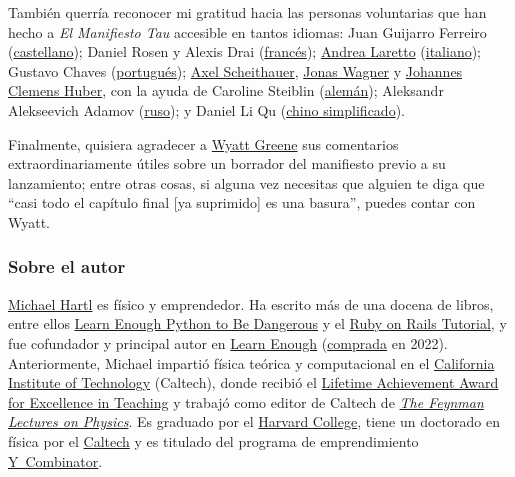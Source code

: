 También querría reconocer mi gratitud hacia las personas voluntarias que han hecho a \emph{El Manifiesto Tau} accesible en tantos idiomas: Juan Guijarro Ferreiro (\href{https://tauday.com/el-manifiesto-tau}{castellano}); Daniel Rosen y Alexis Drai (\href{https://tauday.com/le-manifeste-de-tau}{francés}); \href{https://iwilare.com/}{Andrea Laretto} (\href{https://tauday.com/il-tau-manifesto}{italiano}); Gustavo Chaves (\href{https://tauday.com/o-manifesto-tau}{portugués}); \href{https://www.linkedin.com/in/axelscheithauer/}{Axel Scheithauer}, \href{https://blog.purpureus.net/about}{Jonas Wagner} y \href{https://www.blogger.com/profile/05561964491693491031}{Johannes Clemens Huber}, con la ayuda de Caroline Steiblin (\href{https://tauday.com/das-tau-manifest}{alemán}); Aleksandr Alekseevich Adamov (\href{https://tauday.com/tau-manifesto-ru}{ruso}); y Daniel Li Qu (\href{https://tauday.com/tau-manifesto-cn}{chino simplificado}).

Finalmente, quisiera agradecer a \href{http://techiferous.com/about}{Wyatt Greene} sus comentarios extraordinariamente útiles sobre un borrador del manifiesto previo a su lanzamiento; entre otras cosas, si alguna vez necesitas que alguien te diga que ``casi todo el capítulo final [ya suprimido] es una basura'', puedes contar con Wyatt.



    \subsubsection{Sobre el autor} %
    \label{sec:about_the_author}


\href{http://www.michaelhartl.com/}{Michael Hartl} es físico y emprendedor. Ha escrito más de una docena de libros, entre ellos \href{https://www.learnenough.com/python}{Learn Enough Python to Be Dangerous} y el \href{https://www.railstutorial.org/}{Ruby on Rails Tutorial}, y fue cofundador y principal autor en \href{https://www.learnenough.com/}{Learn Enough} (\href{https://news.learnenough.com/big-news-about-learn-enough}{comprada} en 2022). Anteriormente, Michael impartió física teórica y computacional en el \href{http://www.caltech.edu/}{California Institute of Technology} (Caltech), donde recibió el \href{https://www.michaelhartl.com/ascit/awards2000.html}{Lifetime Achievement Award for Excellence in Teaching} y trabajó como editor de Caltech de \href{http://www.feynmanlectures.caltech.edu/}{\emph{The Feynman Lectures on Physics}}. Es graduado por el \href{http://college.harvard.edu/}{Harvard College}, tiene un doctorado en física por el \href{http://www.caltech.edu/}{Caltech} y es titulado del programa de emprendimiento \href{http://ycombinator.com/}{Y~Combinator}.

